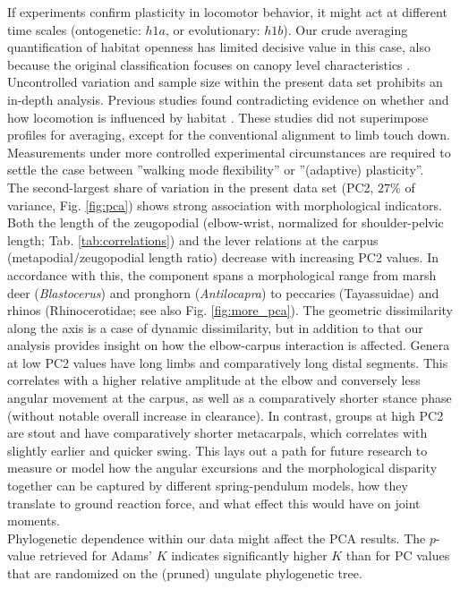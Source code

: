 \documentclass[10pt, a4paper]{article}
\begin{document}
If experiments confirm plasticity in locomotor behavior, it might act at different time scales (ontogenetic: $h1a$, or evolutionary: $h1b$).
Our crude averaging quantification of habitat openness has limited decisive value in this case, also because the original classification focuses on canopy level characteristics \citep{Stankowich2009}. 
Uncontrolled variation and sample size within the present data set prohibits an in-depth analysis. 
Previous studies found contradicting evidence on whether and how locomotion is influenced by habitat \citep[][]{Stoessel2012,Fuller2011,Arnold1983,Schulte2004,Druelle2019}. 
These studies did not superimpose profiles for averaging, except for the conventional alignment to limb touch down. 
Measurements under more controlled experimental circumstances are required to settle the case between ''walking mode flexibility'' or ''(adaptive) plasticity''. 
\medskip\\The second-largest share of variation in the present data set (PC2, $27\%$ of variance, Fig. \ref{fig:pca}) shows strong association with morphological indicators. 
Both the length of the zeugopodial (elbow-wrist, normalized for shoulder-pelvic length; Tab. \ref{tab:correlations}) and the lever relations at the carpus (metapodial/zeugopodial length ratio) decrease with increasing PC2 values. 
In accordance with this, the component spans a morphological range from marsh deer (\textit{Blastocerus}) and pronghorn (\textit{Antilocapra}) to peccaries (Tayassuidae) and rhinos (Rhinocerotidae; see also Fig. \ref{fig:more_pca}). 
The geometric dissimilarity along the axis is a case of dynamic dissimilarity, but in addition to that our analysis provides insight on how the elbow-carpus interaction is affected. 
Genera at low PC2 values have long limbs and comparatively long distal segments. 
This correlates with a higher relative amplitude at the elbow and conversely less angular movement at the carpus, as well as a comparatively shorter stance phase (without notable overall increase in clearance). 
In contrast, groups at high PC2 are stout and have comparatively shorter metacarpals, which correlates with slightly earlier and quicker swing. 
This lays out a path for future research to measure or model how the angular excursions and the morphological disparity together can be captured by different spring-pendulum models, how they translate to ground reaction force, and what effect this would have on joint moments. 
\\Phylogenetic dependence within our data might affect the PCA results. 
The $p$-value retrieved for Adams' $K$ indicates significantly higher $K$ than for PC values that are randomized on the (pruned) ungulate phylogenetic tree. 
\end{document}
